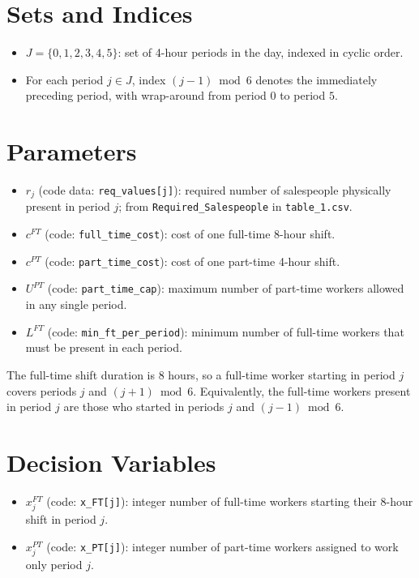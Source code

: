 \section*{Sets and Indices}

\begin{itemize}
    \item $J = \{0,1,2,3,4,5\}$: set of 4-hour periods in the day, indexed in cyclic order.
    \item For each period $j \in J$, index $(j-1) \bmod 6$ denotes the immediately preceding period, with wrap-around from period $0$ to period $5$.
\end{itemize}

\section*{Parameters}

\begin{itemize}
    \item $r_j$ (code data: \texttt{req\_values[j]}): required number of salespeople physically present in period $j$; from \texttt{Required\_Salespeople} in \texttt{table\_1.csv}.
    \item $c^{FT}$ (code: \texttt{full\_time\_cost}): cost of one full-time 8-hour shift.
    \item $c^{PT}$ (code: \texttt{part\_time\_cost}): cost of one part-time 4-hour shift.
    \item $U^{PT}$ (code: \texttt{part\_time\_cap}): maximum number of part-time workers allowed in any single period.
    \item $L^{FT}$ (code: \texttt{min\_ft\_per\_period}): minimum number of full-time workers that must be present in each period.
\end{itemize}

The full-time shift duration is 8 hours, so a full-time worker starting in period $j$ covers periods $j$ and $(j+1)\bmod 6$. Equivalently, the full-time workers present in period $j$ are those who started in periods $j$ and $(j-1)\bmod 6$.

\section*{Decision Variables}

\begin{itemize}
    \item $x^{FT}_j$ (code: \texttt{x\_FT[j]}): integer number of full-time workers starting their 8-hour shift in period $j$.
    \item $x^{PT}_j$ (code: \texttt{x\_PT[j]}): integer number of part-time workers assigned to work only period $j$.
\end{itemize}


